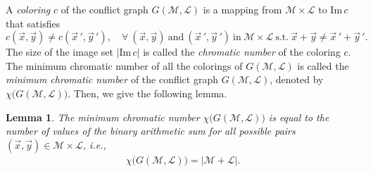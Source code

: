 \documentclass[11pt,draftclsnofoot,onecolumn]{IEEEtran}
\newtheorem{lemma}{Lemma}
\def\Im{\mathrm{Im}}
\begin{document}
A \emph{coloring} $c$ of  the conflict graph $G(\mathcal{M},\mathcal{L})$ is a mapping from $\mathcal{M}\times\mathcal{L}$ to $\Im\,c$ that satisfies
\begin{equation*}
c(\vec{x},\vec{y})\neq c(\vec{x}\,',\vec{y}\,'),\quad \forall~(\vec{x},\vec{y})~\text{and}~ (\vec{x}\,',\vec{y}\,')~\text{in}~\mathcal{M}\times\mathcal{L}~\text{s.t.}~\vec{x}+\vec{y}\neq \vec{x}\,'+\vec{y}\,'.
\end{equation*}
The size of the image set $|\Im\,c|$ is called the \emph{chromatic number} of the coloring $c$.
The minimum chromatic number of all the colorings of $G(\mathcal{M},\mathcal{L})$ is called the
 \emph{minimum chromatic number} of the conflict graph $G(\mathcal{M},\mathcal{L})$, denoted by
  $\chi\big(G(\mathcal{M},\mathcal{L})\big)$.
Then, we give the following lemma.
\begin{lemma}\label{lemma:chi(G(P))-equiv-form}
The minimum chromatic number $\chi\big(G(\mathcal{M},\mathcal{L})\big)$ is equal to the number of values of the binary arithmetic sum for all possible pairs $(\vec{x},\vec{y})\in\mathcal{M}\times \mathcal{L}$, i.e.,
\begin{align}\label{eq:chi(G(P))-low-bound}
\chi\big(G(\mathcal{M},\mathcal{L})\big)=|\mathcal{M}+\mathcal{L}|.\nonumber
\end{align}
\end{lemma}
\end{document}
